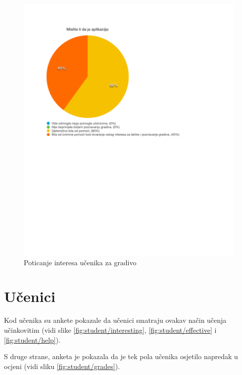\documentclass[11pt]{scrreprt}
\begin{document}
\begin{figure}[H]
  \centering
  \includegraphics{school/help}
  \caption{Poticanje interesa učenika za gradivo}
  \label{fig:school/help}
\end{figure}

\section{Učenici}

Kod učenika su ankete pokazale da učenici smatraju ovakav način učenja
učinkovitim (vidi slike \ref{fig:student/interesting},
\ref{fig:student/effective} i \ref{fig:student/help}).

S druge strane, anketa je pokazala da je tek pola učenika osjetilo napredak u
ocjeni (vidi sliku \ref{fig:student/grades}).
\end{document}
